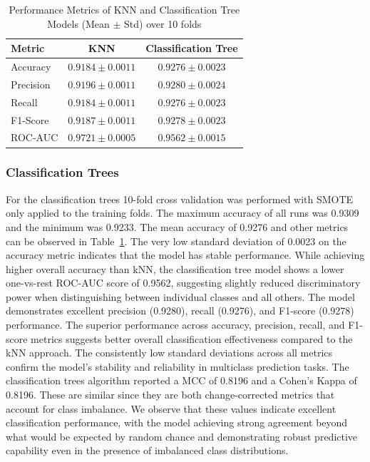 \documentclass[10pt, conference]{IEEEtran}
\begin{document}
\begin{table}[htbp]
	\centering
	\caption{Performance Metrics of KNN and Classification Tree Models (Mean $\pm$ Std) over 10 folds}
	\label{tab:model_comparison}
	\begin{tabular}{|l|c|c|}
		\hline
		\textbf{Metric} & \textbf{KNN} & \textbf{Classification Tree} \\
		\hline
		Accuracy & $0.9184 \pm 0.0011$ & $0.9276 \pm 0.0023$ \\
		Precision & $0.9196 \pm 0.0011$ & $0.9280 \pm 0.0024$ \\
		Recall & $0.9184 \pm 0.0011$ & $0.9276 \pm 0.0023$ \\
		F1-Score & $0.9187 \pm 0.0011$ & $0.9278 \pm 0.0023$ \\
		ROC-AUC & $0.9721 \pm 0.0005$ & $0.9562 \pm 0.0015$ \\
		\hline
	\end{tabular}
\end{table}



\subsubsection{Classification Trees}
For the classification trees 10-fold cross validation was performed with SMOTE only applied to the training folds. The maximum accuracy of all runs was 0.9309 and the minimum was 0.9233. The mean accuracy of 0.9276 and other metrics can be observed in Table~\ref{tab:model_comparison}. The very low standard deviation of 0.0023 on the accuracy metric indicates that the model has stable performance. While achieving higher overall accuracy than kNN, the classification tree model shows a lower one-vs-rest ROC-AUC score of 0.9562, suggesting slightly reduced discriminatory power when distinguishing between individual classes and all others. The model demonstrates excellent precision (0.9280), recall (0.9276), and F1-score (0.9278) performance. The superior performance across accuracy, precision, recall, and F1-score metrics suggests better overall classification effectiveness compared to the kNN approach. The consistently low standard deviations across all metrics confirm the model's stability and reliability in multiclass prediction tasks. The classification trees algorithm reported a MCC of 0.8196 and a Cohen's  Kappa of 0.8196. These are similar since they are both change-corrected metrics that account for class imbalance. We observe that these values indicate excellent classification performance, with the model achieving strong agreement beyond what would be expected by random chance and demonstrating robust predictive capability even in the presence of imbalanced class distributions.
\end{document}
